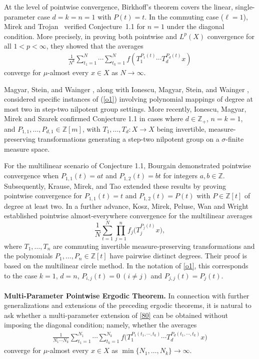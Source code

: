 \documentclass[11 pt,letterpaper]{amsart}
\theoremstyle{plain}
\theoremstyle{definition}
\theoremstyle{remark} \theoremstyle{exam} \theoremstyle{ob}
\numberwithin{equation}{section}
\begin{document}
\medskip






At the level of pointwise convergence, Birkhoff’s theorem covers the linear, single-parameter case $d=k=n=1$ with $P(t)=t$.  In the commuting case ($\ell=1$), Mirek and Trojan~\cite{MT} verified Conjecture~1.1 for $n=1$ under the diagonal condition. More precisely, in proving both pointwise and $L^{p}(X)$ convergence for all $1<p<\infty$, they showed that the averages
\begin{align}\label{80}
	\frac{1}{N^{k}}
	\sum_{t_1=1}^{N}\cdots\sum_{t_k=1}^{N}
	f\left(
	T_1^{P_1(t)}\cdots T_d^{P_d(t)}x
	\right)
\end{align}
converge for $\mu$-almost every $x \in X$ as $N \to \infty$.


Magyar, Stein, and Wainger \cite{MSW2}, along with Ionescu, Magyar, Stein, and Wainger \cite{IMSW}, considered specific instances of (\ref{o1}) involving polynomial mappings of degree at most two in step-two nilpotent group settings. More recently, Ionescu, Magyar,  Mirek and Szarek \cite{IMMS1} confirmed Conjecture 1.1 in cases where $d \in \mathbb{Z}_+$, $n= k = 1$, and $P_{1,1}, \ldots, P_{d,1} \in \mathbb{Z}[m]$, with $T_1, \ldots, T_d: X \to X$ being invertible, measure-preserving transformations generating a step-two nilpotent group on a $\sigma$-finite measure space.

For the multilinear scenario of Conjecture 1.1, Bourgain \cite{B44} demonstrated pointwise convergence when $P_{1,1}(t) = at$ and $P_{1,2}(t) = bt$ for integers $a, b \in \mathbb{Z}$. Subsequently, Krause, Mirek, and Tao \cite{KMT} extended these results by proving pointwise convergence  for $P_{1,1}(t) = t$ and $P_{1,2}(t) = P(t)$ with $P \in \mathbb{Z}[t]$ of degree at least two.
In a further advance, Kosz, Mirek, Peluse, Wan and Wright \cite{KMPW} established pointwise almost-everywhere convergence for the  multilinear averages
\[
\frac{1}{N}\sum_{t=1}^{N}
\prod_{j=1}^{n} f_j\bigl(T_j^{P_j(t)}x\bigr),
\]
where \(T_1,\dots,T_n\) are commuting invertible measure-preserving transformations and the polynomials \(P_1,\dots,P_n\in\mathbb Z[t]\) have pairwise distinct degrees. Their proof is based on the multilinear circle method. In the notation of \eqref{o1}, this corresponds to the case \(k=1\), \(d=n\),
$
P_{i,j}(t)=0 \ (i\neq j)$  and $ 
P_{j,j}(t)=P_j(t).
$\\\\
\noindent \textbf{Multi-Parameter Pointwise Ergodic Theorem.}
In connection with further generalizations and extensions of the
preceding ergodic theorems, it is natural to ask whether a
multi-parameter extension of \eqref{80} can be obtained without
imposing the diagonal condition; namely, whether the averages
\begin{align*}
	\frac{1}{N_1\cdots N_k}
\sum_{t_1=1}^{N_1}\cdots\sum_{t_k=1}^{N_k}
	f\bigl(T_1^{P_1(t_1, \cdots, t_k)} \cdots T_d^{P_d(t_1, \cdots, t_k)} x\bigr)
\end{align*}
converge for $\mu$-almost every $x \in X$ as $\min\{N_1,\dots,N_k\}\to\infty$.
\end{document}
